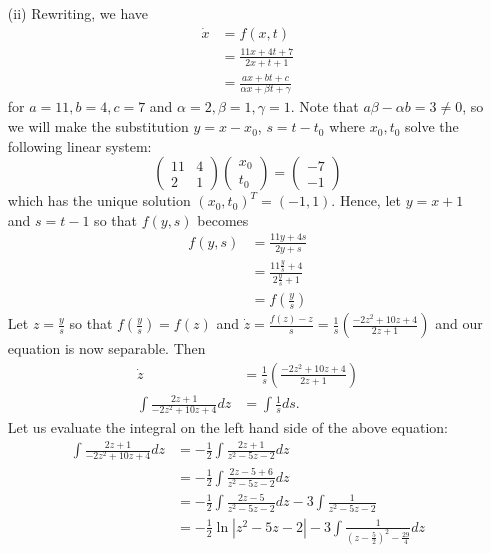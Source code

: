 \documentclass{article}
\begin{document}
\begin{itemize}
\begin{itemize}
        \item[(ii)] Rewriting, we have 
        \begin{align*}
            \dot{x} &= f(x,t)\\
            &= \frac{11x + 4t + 7}{2x + t + 1}\\
            &= \frac{ax + bt + c}{\alpha x + \beta t + \gamma}
        \end{align*}
        for $a = 11, b = 4, c = 7$ and $\alpha = 2, \beta = 1, \gamma = 1$. Note that $a\beta - \alpha b = 3 \neq 0$, so we will make the substitution $y = x - x_0$, $s = t - t_0$ where $x_0, t_0$ solve the following linear system:
        \[\begin{pmatrix}
            11 & 4\\
            2 & 1
        \end{pmatrix}\begin{pmatrix}
            x_0\\
            t_0
        \end{pmatrix} = \begin{pmatrix}
            -7\\
            -1
        \end{pmatrix}\]
        which has the unique solution $(x_0,t_0)^T = (-1,1)$. Hence, let $y = x + 1$ and $s = t - 1$ so that $f(y,s)$ becomes
        \begin{align*}
            f(y,s) &= \frac{11y + 4s}{2y + s}\\
            &= \frac{11\tfrac{y}{s} + 4}{2\tfrac{y}{s} + 1}\\
            &= f\left(\frac{y}{s}\right)
        \end{align*}
        Let $z = \tfrac{y}{s}$ so that $f\left(\tfrac{y}{s}\right) = f(z)$ and $\dot{z} = \tfrac{f(z) - z}{s} = \tfrac{1}{s}\left(\tfrac{-2z^2 + 10z + 4}{2z + 1}\right)$ and our equation is now separable. Then 
        \begin{align*}
            \dot{z} &= \frac{1}{s}\left(\frac{-2z^2 + 10z + 4}{2z + 1}\right)\\
            \int \frac{2z+1}{-2z^2 + 10z + 4}dz &= \int\frac{1}{s}ds.
        \end{align*}
        Let us evaluate the integral on the left hand side of the above equation:
        \begin{equation}
            \begin{aligned}
                \int \frac{2z + 1}{-2z^2 + 10z + 4}dz &= -\frac{1}{2} \int \frac{2z + 1}{z^2 - 5z - 2}dz\\
                &= -\frac{1}{2}\int \frac{2z - 5 + 6}{z^2 - 5z - 2}dz\\
                &= -\frac{1}{2}\int \frac{2z - 5}{z^2 - 5z - 2}dz - 3\int \frac{1}{z^2 - 5z - 2}\\
                &= -\frac{1}{2}\ln|z^2 - 5z - 2| - 3\int\frac{1}{\left(z - \tfrac{5}{2}\right)^2 - \tfrac{29}{4}}dz\\
            \end{aligned}
        \end{equation}
        

\end{itemize}
\end{itemize}
\end{document}
